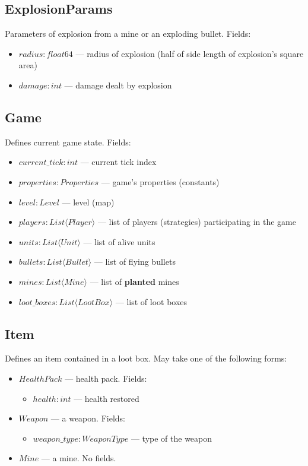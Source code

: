 \subsection{ExplosionParams}
Parameters of explosion from a mine or an exploding bullet. Fields:
\begin{itemize}
    \item $radius : float64$ --- radius of explosion (half of side length of explosion's square area)
    \item $damage : int$ --- damage dealt by explosion
\end{itemize}

\subsection{Game}
Defines current game state. Fields:
\begin{itemize}
    \item $current\_tick : int$ --- current tick index
    \item $properties : Properties$ --- game's properties (constants)
    \item $level : Level$ --- level (map)
    \item $players : List \langle Player \rangle$ --- list of players (strategies) participating in the game
    \item $units : List \langle Unit \rangle$ --- list of alive units
    \item $bullets : List \langle Bullet \rangle$ --- list of flying bullets
    \item $mines : List \langle Mine \rangle$ --- list of \textbf{planted} mines
    \item $loot\_boxes : List \langle LootBox \rangle$ --- list of loot boxes
\end{itemize}

\subsection{Item}
Defines an item contained in a loot box.
May take one of the following forms:
\begin{itemize}
    \item $HealthPack$ --- health pack. Fields:
        \begin{itemize}
            \item $health : int$ --- health restored
        \end{itemize}
    \item $Weapon$ --- a weapon. Fields:
        \begin{itemize}
            \item $weapon\_type : WeaponType$ --- type of the weapon
        \end{itemize}
    \item $Mine$ --- a mine. No fields.
\end{itemize}

